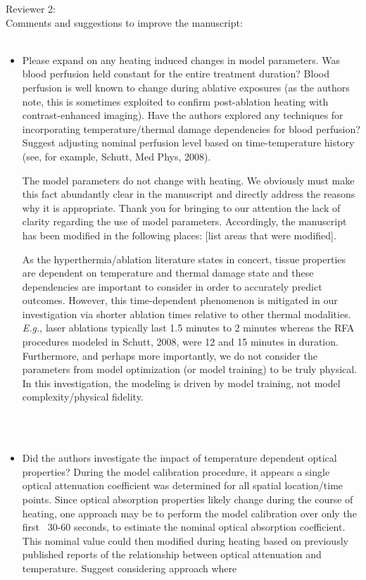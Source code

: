 \documentclass[letterpaper,12pt]{report}
\begin{document}
Reviewer 2:\\
Comments and suggestions to improve the manuscript:\\
\\
\begin{itemize}
\item
Please expand on any heating induced changes in model parameters. Was blood perfusion held constant for the
entire treatment duration? Blood perfusion is well
known to change during ablative exposures (as the
authors note, this is sometimes exploited to confirm post-ablation heating with contrast-enhanced imaging).  Have the authors explored any techniques for
incorporating temperature/thermal damage dependencies for blood perfusion? Suggest adjusting nominal
perfusion level based on time-temperature history (see, for example, Schutt, Med Phys, 2008).

{\color{red}
The model parameters do not change with heating. We obviously must make this fact abundantly clear in the
manuscript and directly address the reasons why it is appropriate. Thank you for bringing to our attention
the lack of clarity regarding the use of model parameters. Accordingly, the manuscript has been
modified in the following places:
{\color{green}[list areas that were modified]}.

As the hyperthermia/ablation literature states in concert, tissue properties are dependent on temperature
and thermal damage state and these dependencies are important to consider in order to accurately predict
outcomes. However, this time-dependent phenomenon is mitigated in our investigation via shorter ablation
times relative to other thermal modalities. \textit{E.g.}, laser ablations typically last 1.5 minutes to 2 minutes
whereas the RFA procedures modeled in Schutt, 2008, were 12 and 15 minutes in duration. Furthermore, and
perhaps more importantly, we do not consider the parameters from model optimization (or model
training) to be truly physical. In this investigation, the modeling is driven by model training, not model
complexity/physical fidelity. 
}\\
\\
\item
Did the authors investigate the impact of temperature dependent optical properties? During the model
calibration procedure, it appears a single optical attenuation coefficient was determined for all spatial
location/time points. Since optical absorption properties likely change during the course of heating,
one approach may be to perform the model calibration over only the first ~30-60 seconds, to estimate the
nominal optical absorption coefficient. This nominal value could then modified during heating based on
previously published reports of the relationship between optical attenuation and temperature. Suggest
considering approach where


\end{itemize}
\end{document}

